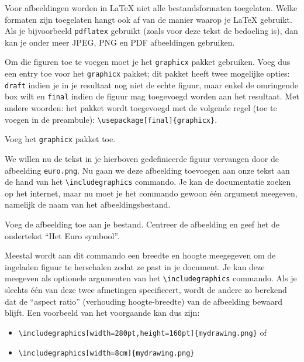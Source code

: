 \documentclass[12pt, dutch]{article}
\newcommand{\bs}{\textbackslash}
\begin{document}
Voor afbeeldingen worden in \LaTeX{} niet alle bestandsformaten
toegelaten. Welke formaten zijn toegelaten hangt ook af van de manier
waarop je \LaTeX{} gebruikt. Als je bijvoorbeeld \texttt{pdflatex} gebruikt
(zoals voor deze tekst de bedoeling is), dan kan je onder meer JPEG,
PNG en PDF afbeeldingen gebruiken.

Om die figuren toe te voegen moet je het \texttt{graphicx} pakket
gebruiken. Voeg dus een entry toe voor het
\texttt{graphicx} pakket; dit pakket heeft twee mogelijke opties:
\texttt{draft} indien je in je resultaat nog niet de echte figuur, maar
enkel de omringende box wilt en \texttt{final} indien de figuur mag
toegevoegd worden aan het resultaat. Met andere woorden: het pakket
wordt toegevoegd met de volgende regel (toe te voegen in de
preambule): \texttt{\bs{}usepackage[final]\{graphicx\}}.

\begin{tcolorbox}[title=Opgave 5g]
  Voeg het \texttt{graphicx} pakket toe.
\end{tcolorbox}

We willen nu de tekst in je hierboven gedefinieerde figuur vervangen
door de afbeelding \texttt{euro.png}. Nu gaan we deze afbeelding toevoegen
aan onze tekst aan de hand van het \texttt{\bs{}includegraphics}
commando. Je kan de documentatie zoeken op het internet, maar nu moet je het commando
gewoon \'e\'en argument meegeven, namelijk de naam van het
afbeeldingsbestand.
\begin{tcolorbox}[title=Opgave 5h]
  Voeg de afbeelding toe aan je bestand. Centreer de afbeelding en geef het de
  ondertekst ``Het Euro symbool''.
\end{tcolorbox}

Meestal wordt aan dit commando een breedte en hoogte meegegeven om de
ingeladen figuur te herschalen zodat ze past in je document. Je kan
deze meegeven als optionele argumenten van het \texttt{\bs{}includegraphics} commando.
Als je slechts \'e\'en van deze twee afmetingen specificeert, wordt de andere zo
berekend dat de ``aspect ratio'' (verhouding hoogte-breedte) van de afbeelding
bewaard blijft. Een voorbeeld van het voorgaande kan dus zijn:

\begin{itemize}
  \item \texttt{\bs{}includegraphics[width=280pt,height=160pt]\{mydrawing.png\}} of
  \item \texttt{\bs{}includegraphics[width=8cm]\{mydrawing.png\}}
\end{itemize}
\end{document}
